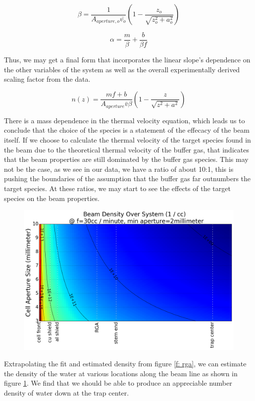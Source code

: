 \documentclass[a4paper]{article}
\begin{document}
$$\beta = \frac{1}{A_{aperture, o} \bar{v_o}}\left(1-\frac{z_o}{\sqrt{z_o^2+a_o^2}}\right)$$

$$\alpha=\frac{m}{\beta}+\frac{b}{\beta f}$$

Thus, we may get a final form that incorporates the linear slope's dependence on the other variables of the system as well as the overall experimentally derived scaling factor from the data.

$$n(z)=\frac{mf+b}{A_{aperture} \bar{v} \beta}\left(1-\frac{z}{\sqrt{z^2+a^2}}\right)$$

There is a mass dependence in the thermal velocity equation, which leads us to conclude that the choice of the species is a statement of the effecacy of the beam itself. If we choose to calculate the thermal velocity of the target species found in the beam due to the theoretical thermal velocity of the buffer gas, that indicates that the beam properties are still dominated by the buffer gas species. This may not be the case, as we see in our data, we have a ratio of about 10:1, this is pushing the boundaries of the assumption that the buffer gas far outnumbers the target species. At these ratios, we may start to see the effects of the target species on the beam properties.

\begin{figure}[H]
\centering
\includegraphics[width=1\textwidth]{CBGB_beam_density_over_system.png}
\caption{}
\label{f: beam_density}
\end{figure}

Extrapolating the fit and estimated density from figure \ref{f: rga}, we can estimate the density of the water at various locations along the beam line as shown in figure \ref{f: beam_density}. We find that we should be able to produce an appreciable number density of water down at the trap center.
\end{document}
